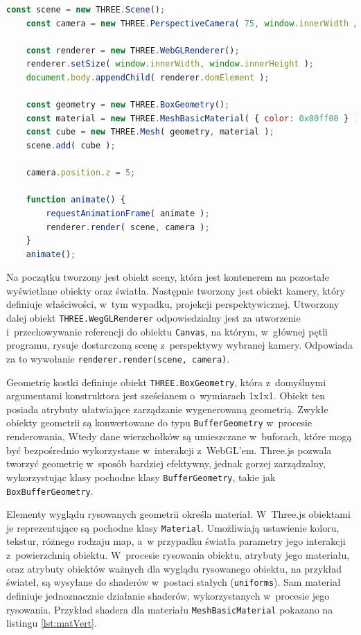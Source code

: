 \begin{lstlisting}[float=h,language=javascript, label={lst:threejs:base}, caption={Hello World w~świecie grafiki 3D}]
    const scene = new THREE.Scene();
    const camera = new THREE.PerspectiveCamera( 75, window.innerWidth / window.innerHeight, 0.1, 1000 );
    
    const renderer = new THREE.WebGLRenderer();
    renderer.setSize( window.innerWidth, window.innerHeight );
    document.body.appendChild( renderer.domElement );

    const geometry = new THREE.BoxGeometry();
    const material = new THREE.MeshBasicMaterial( { color: 0x00ff00 } );
    const cube = new THREE.Mesh( geometry, material );
    scene.add( cube );

    camera.position.z = 5;

    function animate() {
        requestAnimationFrame( animate );
        renderer.render( scene, camera );
    }
    animate();
\end{lstlisting}

Na początku tworzony jest obiekt sceny, która jest kontenerem na pozostałe wyświetlane obiekty oraz światła. Następnie tworzony jest obiekt kamery, który definiuje właściwości, w~tym wypadku, projekcji perspektywicznej. Utworzony dalej obiekt \texttt{THREE.WegGLRenderer} odpowiedzialny jest za utworzenie i~przechowywanie referencji do obiektu \texttt{Canvas}, na którym, w~głównej pętli programu, rysuje dostarczoną scenę z~perspektywy wybranej kamery. Odpowiada za to wywołanie \texttt{renderer.render(scene, camera)}.

Geometrię kostki definiuje obiekt \texttt{THREE.BoxGeometry}, która z~domyślnymi argumentami konstruktora jest sześcianem o~wymiarach 1x1x1. Obiekt ten posiada atrybuty ułatwiające zarządzanie wygenerowaną geometrią. Zwykłe obiekty geometrii są konwertowane do typu \texttt{BufferGeometry} w~procesie renderowania, Wtedy dane wierzchołków są umieszczane w~buforach, które mogą być bezpośrednio wykorzystane w~interakcji z~WebGL'em. Three.js pozwala tworzyć geometrię w~sposób bardziej efektywny, jednak gorzej zarządzalny, wykorzystując klasy pochodne klasy \texttt{BufferGeometry}, takie jak \texttt{BoxBufferGeometry}.

Elementy wyglądu rysowanych geometrii określa materiał. W~Three.js obiektami je reprezentujące są pochodne klasy \texttt{Material}. Umożliwiają ustawienie koloru, tekstur, różnego rodzaju map, a~w przypadku światła parametry jego interakcji z~powierzchnią obiektu. W~procesie rysowania obiektu, atrybuty jego materiału, oraz atrybuty obiektów ważnych dla wyglądu rysowanego obiektu, na przykład świateł, są wysyłane do shaderów w~postaci stałych (\texttt{uniforms}). Sam materiał definiuje jednoznacznie działanie shaderów, wykorzystanych w~procesie jego rysowania. Przykład shadera dla materiału \texttt{MeshBasicMaterial} pokazano na listingu \ref{lst:matVert}.

